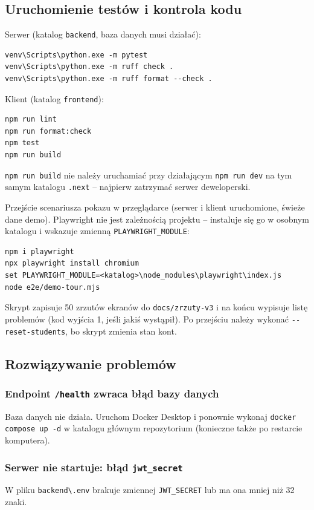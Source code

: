 \subsection{Uruchomienie testów i kontrola kodu}

Serwer (katalog \texttt{backend}, baza danych musi działać):
\begin{lstlisting}
venv\Scripts\python.exe -m pytest
venv\Scripts\python.exe -m ruff check .
venv\Scripts\python.exe -m ruff format --check .
\end{lstlisting}

Klient (katalog \texttt{frontend}):
\begin{lstlisting}
npm run lint
npm run format:check
npm test
npm run build
\end{lstlisting}
\texttt{npm run build} nie należy uruchamiać przy działającym \texttt{npm run dev} na tym samym katalogu \texttt{.next} -- najpierw zatrzymać serwer deweloperski.

Przejście scenariusza pokazu w przeglądarce (serwer i klient uruchomione, świeże dane demo). Playwright nie jest zależnością projektu -- instaluje się go w osobnym katalogu i wskazuje zmienną \texttt{PLAYWRIGHT\_MODULE}:
\begin{lstlisting}
npm i playwright
npx playwright install chromium
set PLAYWRIGHT_MODULE=<katalog>\node_modules\playwright\index.js
node e2e/demo-tour.mjs
\end{lstlisting}
Skrypt zapisuje 50 zrzutów ekranów do \nolinkurl{docs/zrzuty-v3} i na końcu wypisuje listę problemów (kod wyjścia 1, jeśli jakiś wystąpił). Po przejściu należy wykonać \texttt{-{}-reset-students}, bo skrypt zmienia stan kont.

\subsection{Rozwiązywanie problemów}

\subsubsection{Endpoint \texttt{/health} zwraca błąd bazy danych}
Baza danych nie działa. Uruchom Docker Desktop i ponownie wykonaj \texttt{docker compose up -d} w katalogu głównym repozytorium (konieczne także po restarcie komputera).

\subsubsection{Serwer nie startuje: błąd \texttt{jwt\_secret}}
W pliku \texttt{backend\textbackslash.env} brakuje zmiennej \texttt{JWT\_SECRET} lub ma ona mniej niż 32 znaki.

